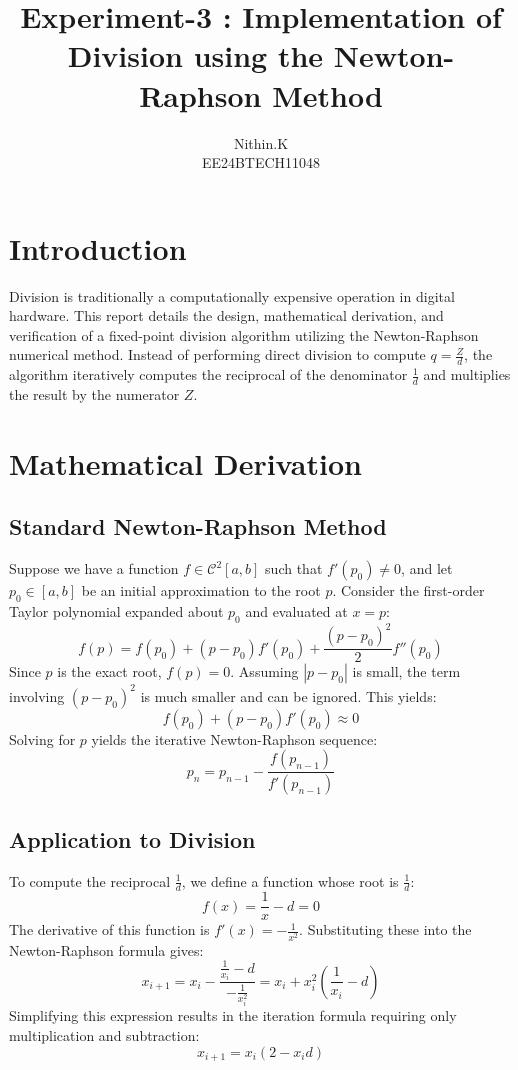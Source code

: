 \documentclass[12pt,a4paper]{article}
\title{\textbf{Experiment-3 : Implementation of Division using the Newton-Raphson Method}}
\author{Nithin.K \\ EE24BTECH11048}
\begin{document}
\maketitle

\section{Introduction}
Division is traditionally a computationally expensive operation in digital hardware. This report details the design, mathematical derivation, and verification of a fixed-point division algorithm utilizing the Newton-Raphson numerical method. Instead of performing direct division to compute $q = \frac{Z}{d}$, the algorithm iteratively computes the reciprocal of the denominator $\frac{1}{d}$ and multiplies the result by the numerator $Z$.

\section{Mathematical Derivation}

\subsection{Standard Newton-Raphson Method}
Suppose we have a function $f \in \mathcal{C}^{2}[a,b]$ such that $f'(p_0) \neq 0$, and let $p_0 \in [a,b]$ be an initial approximation to the root $p$. Consider the first-order Taylor polynomial expanded about $p_0$ and evaluated at $x = p$:
\begin{equation}
    f(p) = f(p_0) + (p - p_0)f'(p_0) + \frac{(p - p_0)^2}{2}f''(p_0)
\end{equation}
Since $p$ is the exact root, $f(p) = 0$. Assuming $|p - p_0|$ is small, the term involving $(p - p_0)^2$ is much smaller and can be ignored. This yields:
\begin{equation}
    f(p_0) + (p - p_0)f'(p_0) \approx 0
\end{equation}
Solving for $p$ yields the iterative Newton-Raphson sequence:
\begin{equation}
    p_{n} = p_{n-1} - \frac{f(p_{n-1})}{f'(p_{n-1})}
\end{equation}

\subsection{Application to Division}
To compute the reciprocal $\frac{1}{d}$, we define a function whose root is $\frac{1}{d}$:
\begin{equation}
    f(x) = \frac{1}{x} - d = 0
\end{equation}
The derivative of this function is $f'(x) = -\frac{1}{x^2}$. Substituting these into the Newton-Raphson formula gives:
\begin{equation}
    x_{i+1} = x_i - \frac{\frac{1}{x_i} - d}{-\frac{1}{x_i^2}} = x_i + x_i^2\left(\frac{1}{x_i} - d\right)
\end{equation}
Simplifying this expression results in the iteration formula requiring only multiplication and subtraction:
\begin{equation}
    x_{i+1} = x_i(2 - x_i d)
\end{equation}
\end{document}
